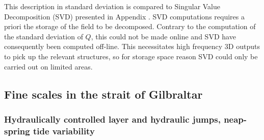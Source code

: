 This description in standard deviation is compared to Singular Value Decomposition (SVD) presented in Appendix . SVD computations requires a priori the storage of the field to be decomposed. Contrary to the computation of the standard deviation of $Q$, this could not be made online and SVD have consequently been computed off-line. This necessitates high frequency 3D outputs to pick up the relevant structures, so for storage space reason SVD could only be carried out on limited areas.  


\subsection{Fine scales in the strait of Gilbraltar}
\label{section3DRes}

\subsubsection{Hydraulically controlled layer and hydraulic jumps, neap-spring tide variability}
\label{section3DResFlow}

